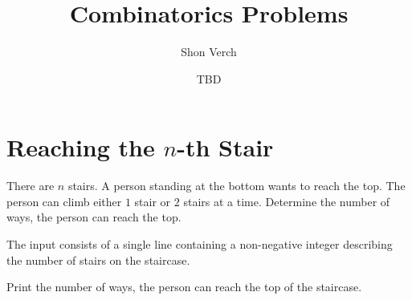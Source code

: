 \documentclass{problem-set}
\title{Combinatorics Problems}
\date{TBD}
\author{Shon Verch}
\begin{document}
\maketitle

\section{Reaching the $n$-th Stair}
There are $n$ stairs. A person standing at the bottom wants to reach the top. The person can climb either $1$ stair or $2$ stairs at a time.
Determine the number of ways, the person can reach the top.

The input consists of a single line containing a non-negative integer describing the number of stairs on the staircase.

\outputformat
Print the number of ways, the person can reach the top of the staircase.


\pushnewpage
{}
\end{document}
